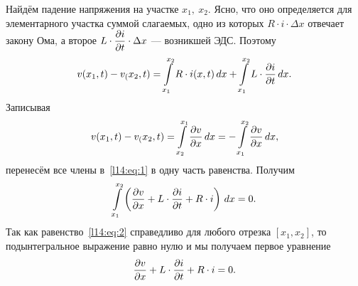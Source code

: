 Найдём падение напряжения на участке $x_1,\ x_2$. Ясно, что оно определяется для элементарного участка суммой слагаемых, одно из которых $R\cdot i\cdot\Delta x$ отвечает закону Ома, а второе $\displaystyle L\cdot\frac{\partial i}{\partial t}\cdot\Delta x$ --- возникшей ЭДС. Поэтому 
\begin{equation}\label{l14:eq:1}
	\hfill v(x_1,t)-v_(x_2,t)=\int\limits_{x_1}^{x_2}R\cdot i(x,t)\,dx+\int\limits_{x_1}^{x_2}L\cdot\pder{i}{t}\,dx.\hfill
\end{equation}
Записывая
\begin{equation*}
	\hfill v(x_1,t)-v_(x_2,t)=\int\limits_{x_2}^{x_1}\pder{v}{x}\,dx=-\int\limits_{x_1}^{x_2}\pder{v}{x}\,dx,\hfill
\end{equation*}
перенесём все члены в~\eqref{l14:eq:1} в одну часть равенства. Получим 
\begin{equation}\label{l14:eq:2}
	\hfill \int\limits_{x_1}^{x_2}\left(\pder{v}{x}+L\cdot\pder{i}{t}+R\cdot i\right)\,dx=0.\hfill
\end{equation}
Так как равенство~\eqref{l14:eq:2} справедливо для любого отрезка $[x_1,x_2]$, то подынтегральное выражение равно нулю и мы получаем первое уравнение
\begin{equation}\label{l14:eq:3}
	\hfill \pder{v}{x}+L\cdot\pder{i}{t}+R\cdot i=0.\hfill
\end{equation}

